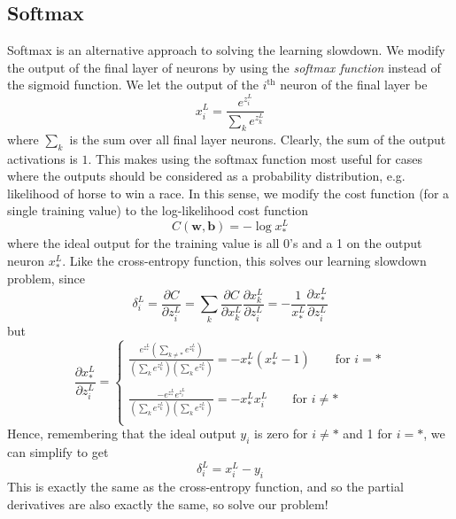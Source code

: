 \documentclass[10pt]{article}
\begin{document}
\subsection{Softmax}
Softmax is an alternative approach to solving the learning slowdown. We modify the output of the final layer of neurons by using the \textit{softmax function} instead of the sigmoid function. We let the output of the $i^{\text{th}}$ neuron of the final layer be
\[
x^{L}_i = \frac{e^{z^L_i}}{\sum_k e^{z^L_k}}
\]
where $\sum_k$ is the sum over all final layer neurons. Clearly, the sum of the output activations is $1$. This makes using the softmax function most useful for cases where the outputs should be considered as a probability distribution, e.g. likelihood of horse to win a race. In this sense, we modify the cost function (for a single training value) to the log-likelihood cost function
\[
C(\mathbf{w},\mathbf{b})= -\log x^L_*
\]
where the ideal output for the training value is all 0's and a 1 on the output neuron $x^L_*$. Like the cross-entropy function, this solves our learning slowdown problem, since
\[
\delta^{L}_i = \frac{\partial C}{\partial z^{L}_i} = \sum_{k} \frac{\partial C}{\partial x^{L}_k} \frac{\partial x^{L}_k}{\partial z^{L}_i}
=
-\frac{1}{x^{L}_*} \frac{\partial x^{L}_*}{\partial z^{L}_i}
\]
but
\[
\frac{\partial x^{L}_*}{\partial z^{L}_i} =
\begin{cases}
\frac{e^{z^L_*}\left( \sum_{k \neq *} e^{z^L_k}\right)}{\left(\sum_k e^{z^L_k}\right) \left(\sum_k e^{z^L_k}\right)} = -x^L_*\left(x^L_* -1\right) \qquad \text{for }i = *\\
\\
\frac{-e^{z^L_*}e^{z^L_i}}{\left(\sum_k e^{z^L_k}\right)\left(\sum_k e^{z^L_k}\right)} = -x^L_* x^L_i \qquad \text{for }i\neq *\\
\end{cases}
\]
Hence, remembering that the ideal output $y_i$ is zero for $i\neq *$ and 1 for $i=*$, we can simplify to get
\[
\delta^{L}_i = x^{L}_i - y_i
\]
This is exactly the same as the cross-entropy function, and so the partial derivatives are also exactly the same, so solve our problem!
\end{document}
